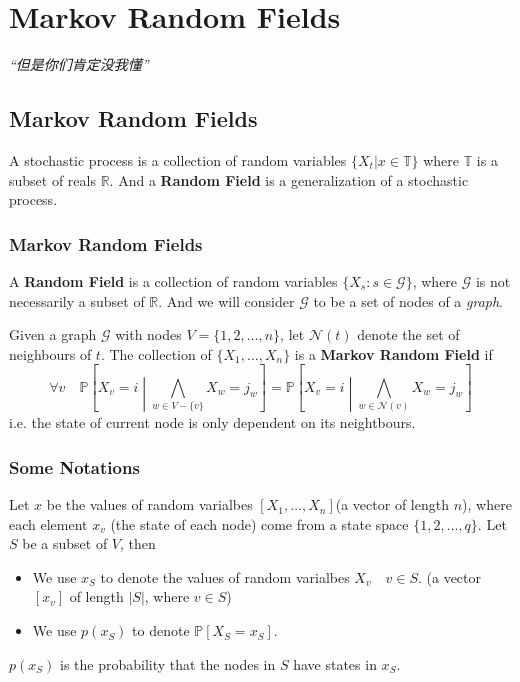 \chapter{Markov Random Fields}
\emph{“但是你们肯定没我懂”}
\newpage


\section{Markov Random Fields}
    A stochastic process is a collection of random variables $\{X_t|x\in\mathbb{T}\}$ where $\mathbb{T}$ is a subset of reals $\mathbb{R}$. And a \textbf{Random Field} is a generalization of a stochastic process.

    \subsection{Markov Random Fields}
        \begin{definition}
            A \textbf{Random Field} is a collection of random variables $\{X_s:s\in\mathcal{G}\}$, where $\mathcal{G}$ is not necessarily a subset of $\mathbb{R}$. And we will consider $\mathcal{G}$ to be a set of nodes of a \emph{graph}. 
        \end{definition}

        \begin{definition}
            Given a graph $\mathcal{G}$ with nodes $V=\{1,2,\dots,n\}$, let $\mathcal{N}(t)$ denote the set of neighbours of $t$. The collection of $\{X_1, \dots, X_n\}$ is a \textbf{Markov Random Field} if
            \[ \forall v \quad \mathbb{P}\left[X_v = i \middle\vert \bigwedge_{w \in V-\{v\}} X_w = j_w\right] = \mathbb{P}\left[X_v = i \middle\vert \bigwedge_{w\in\mathcal{N}(v)}X_w=j_w\right] \]
            i.e. the state of current node is only dependent on its neightbours.
        \end{definition}

    \subsection{Some Notations}
        Let $x$ be the values of random varialbes $[X_1,\dots,X_n]$(a vector of length $n$), where each element $x_v$ (the state of each node) come from a state space $\{1,2,\dots,q\}$. Let $S$ be a subset of $V$, then
        \begin{itemize}
            \item We use $x_S$ to denote the values of random varialbes $X_v \quad v \in S$. (a vector $[x_v]$ of length $|S|$, where $v\in S$)
            \item We use $p(x_S)$ to denote $\mathbb{P}[X_S=x_S]$.
        \end{itemize}
        $p(x_S)$ is the probability that the nodes in $S$ have states in $x_S$.

